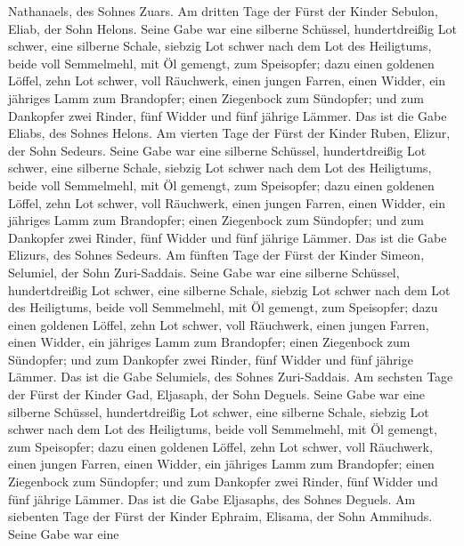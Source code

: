 Nathanaels, des Sohnes Zuars.  Am dritten Tage der Fürst
der Kinder Sebulon, Eliab, der Sohn Helons.  Seine Gabe war
eine silberne Schüssel, hundertdreißig Lot schwer, eine silberne Schale,
siebzig Lot schwer nach dem Lot des Heiligtums, beide voll Semmelmehl,
mit Öl gemengt, zum Speisopfer;  dazu einen goldenen
Löffel, zehn Lot schwer, voll Räuchwerk,  einen jungen
Farren, einen Widder, ein jähriges Lamm zum Brandopfer; 
einen Ziegenbock zum Sündopfer;  und zum Dankopfer zwei
Rinder, fünf Widder und fünf jährige Lämmer. Das ist die Gabe Eliabs,
des Sohnes Helons.  Am vierten Tage der Fürst der Kinder
Ruben, Elizur, der Sohn Sedeurs.  Seine Gabe war eine
silberne Schüssel, hundertdreißig Lot schwer, eine silberne Schale,
siebzig Lot schwer nach dem Lot des Heiligtums, beide voll Semmelmehl,
mit Öl gemengt, zum Speisopfer;  dazu einen goldenen
Löffel, zehn Lot schwer, voll Räuchwerk,  einen jungen
Farren, einen Widder, ein jähriges Lamm zum Brandopfer; 
einen Ziegenbock zum Sündopfer;  und zum Dankopfer zwei
Rinder, fünf Widder und fünf jährige Lämmer. Das ist die Gabe Elizurs,
des Sohnes Sedeurs.  Am fünften Tage der Fürst der Kinder
Simeon, Selumiel, der Sohn Zuri-Saddais.  Seine Gabe war
eine silberne Schüssel, hundertdreißig Lot schwer, eine silberne Schale,
siebzig Lot schwer nach dem Lot des Heiligtums, beide voll Semmelmehl,
mit Öl gemengt, zum Speisopfer;  dazu einen goldenen
Löffel, zehn Lot schwer, voll Räuchwerk,  einen jungen
Farren, einen Widder, ein jähriges Lamm zum Brandopfer; 
einen Ziegenbock zum Sündopfer;  und zum Dankopfer zwei
Rinder, fünf Widder und fünf jährige Lämmer. Das ist die Gabe Selumiels,
des Sohnes Zuri-Saddais.  Am sechsten Tage der Fürst der
Kinder Gad, Eljasaph, der Sohn Deguels.  Seine Gabe war
eine silberne Schüssel, hundertdreißig Lot schwer, eine silberne Schale,
siebzig Lot schwer nach dem Lot des Heiligtums, beide voll Semmelmehl,
mit Öl gemengt, zum Speisopfer;  dazu einen goldenen
Löffel, zehn Lot schwer, voll Räuchwerk,  einen jungen
Farren, einen Widder, ein jähriges Lamm zum Brandopfer; 
einen Ziegenbock zum Sündopfer;  und zum Dankopfer zwei
Rinder, fünf Widder und fünf jährige Lämmer. Das ist die Gabe Eljasaphs,
des Sohnes Deguels.  Am siebenten Tage der Fürst der Kinder
Ephraim, Elisama, der Sohn Ammihuds.  Seine Gabe war eine

